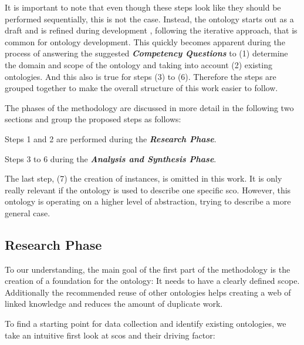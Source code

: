 \documentclass[a4paper, DIV=13, BCOR=0cm]{scrbook}
\newcommand{\pn}[1]{\textit{\textbf{#1}}}
\begin{document}
It is important to note that even though these steps look like they should be performed sequentially, this is not the case. Instead, the ontology starts out as a draft and is refined during development \cite[Section 3, Introduction]{guide-to-ontology}, following the iterative approach, that is common for ontology development. \cite[p.\,158, section 1.5.1]{stuckenschmidt2010ontologien} This quickly becomes apparent during the process of answering the suggested \pn{Competency Questions} to (1) determine the domain and scope of the ontology \cite[Section 3, Step 1]{guide-to-ontology} and taking into account (2) existing ontologies. And this also is true for steps (3) to (6). Therefore the steps are grouped together to make the overall structure of this work easier to follow.

The phases of the methodology are discussed in more detail in the following two sections and group the proposed steps as follows:

\begin{compactenum}
	\item Steps 1 and 2 are performed during the \pn{Research Phase}.
	\item Steps 3 to 6 during the \pn{Analysis and Synthesis Phase}.
\end{compactenum}

The last step, (7) the creation of instances, is omitted in this work. It is only really relevant if the ontology is used to describe one specific \gls{sco}. However, this ontology is operating on a higher level of abstraction, trying to describe a more general case.


\subsection{Research Phase}
To our understanding, the main goal of the first part of the methodology is the creation of a foundation for the ontology: It needs to have a clearly defined scope. Additionally the recommended reuse of other ontologies helps creating a web of linked knowledge and reduces the amount of duplicate work.

To find a starting point for data collection and identify existing ontologies, we take an intuitive first look at \glspl{sco} and their driving factor:
\end{document}
